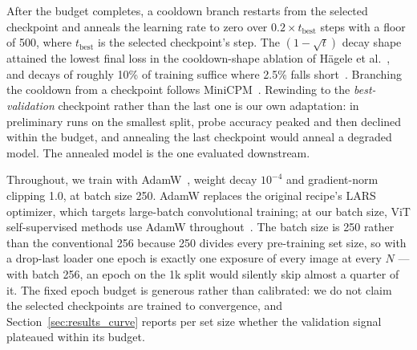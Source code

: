 After the budget completes, a cooldown branch restarts from the selected
checkpoint and anneals the learning rate to zero over $0.2 \times
t_{\mathrm{best}}$ steps with a floor of 500, where $t_{\mathrm{best}}$ is
the selected checkpoint's step. The $(1-\sqrt{t})$ decay shape attained the
lowest final loss in the cooldown-shape ablation of H\"agele et
al.~\cite{hagele2024scaling}, and decays of roughly 10\% of training suffice
where 2.5\% falls short~\cite{hu2024minicpm}. Branching the cooldown from a
checkpoint follows MiniCPM~\cite{hu2024minicpm}. Rewinding to the
\emph{best-validation} checkpoint rather than the last one is our own
adaptation: in preliminary runs on the smallest split, probe accuracy peaked
and then declined within the budget, and annealing the last checkpoint would
anneal a degraded model. The annealed model is the one evaluated downstream.

Throughout, we train with AdamW~\cite{loshchilov2019adamw}, weight decay
$10^{-4}$ and gradient-norm clipping 1.0, at batch size 250. AdamW replaces
the original recipe's LARS optimizer, which targets large-batch
convolutional training; at our batch size, ViT self-supervised methods use
AdamW throughout~\cite{caron2021dino,chen2021mocov3,he2022mae}. The batch
size is 250 rather than the conventional 256 because 250 divides every
pre-training set size, so with a drop-last loader one epoch is exactly one
exposure of every image at every $N$ --- with batch 256, an epoch on the 1k
split would silently skip almost a quarter of it. The fixed epoch budget is
generous rather than calibrated: we do not claim the selected checkpoints are
trained to convergence, and Section~\ref{sec:results_curve} reports per set
size whether the validation signal plateaued within its budget.


